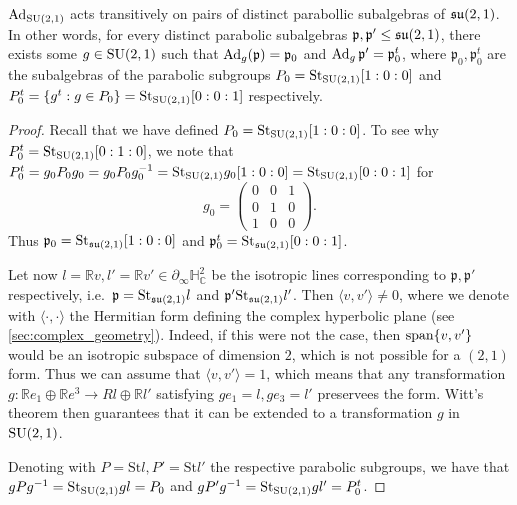 \documentclass{report}
\begin{document}
\begin{lemma}\label{lem:adjoint_parabolic}
    $\operatorname{Ad}_{\operatorname{{\mathrm{SU}}}(2,1)}$ acts transitively on pairs of distinct parabollic subalgebras of $\operatorname{{\mathfrak{su}}}(2,1)$.
    In other words, for every distinct parabolic subalgebras $\mathfrak p, \mathfrak p' \leq \operatorname{{\mathfrak{su}}}(2,1)$, there exists some $g \in \operatorname{{\mathrm{SU}}}(2,1)$ such that $\operatorname{Ad}_g(\mathfrak p) = \mathfrak p_0$ and $\operatorname{Ad}_g \mathfrak p' = \mathfrak p_0^t$, where $\mathfrak p_0,  \mathfrak p_0^t$ are the subalgebras of the parabolic subgroups $P_0 = \mathrm{St}_{\operatorname{{\mathrm{SU}}}(2,1)} [1:0:0]$ and $P_0^t = \left\{ g^t : g \in P_0 \right\} = \mathrm{St}_{\operatorname{{\mathrm{SU}}}(2,1)} [0:0:1]$ respectively.
\end{lemma}
\begin{proof}
    Recall that we have defined $P_0 = \mathrm{St}_{\operatorname{{\mathrm{SU}}}(2,1)}[1:0:0]$.
    To see why $P_0^t = \mathrm{St}_{\operatorname{{\mathrm{SU}}}(2,1)}[0:1:0]$, we note that $P_0^t = g_0 P_0 g_0 = g_0 P_0 g_0^{-1} = \mathrm{St}_{\operatorname{{\mathrm{SU}}}(2,1)} g_0 [1:0:0] = \mathrm{St}_{\operatorname{{\mathrm{SU}}}(2,1)} [0:0:1]$ for
    \[
    g_0 = \begin{pmatrix} 0 & 0 & 1 \\ 0 & 1 & 0 \\ 1 & 0 & 0 \end{pmatrix}.
    \]
    Thus $\mathfrak p_0 = \mathrm{St}_{\operatorname{{\mathfrak{su}}}(2,1)}[1:0:0]$ and $\mathfrak p_0^t = \mathrm{St}_{\operatorname{{\mathfrak{su}}}(2,1)}[0:0:1]$.
    
    Let now $l = \mathbb Rv, l' = \mathbb Rv' \in \partial_\infty \mathbb H^2_\mathbb C$ be the isotropic lines corresponding to $\mathfrak p, \mathfrak p'$ respectively, i.e.\ $\mathfrak p = \mathrm{St}_{\operatorname{{\mathfrak{su}}}(2,1)}l$ and $\mathfrak p' \mathrm{St}_{\operatorname{{\mathfrak{su}}}(2,1)}l'$.
    Then $\langle v, v' \rangle \neq 0$, where we denote with $\langle \cdot, \cdot \rangle$ the Hermitian form defining the complex hyperbolic plane (see \cref{sec:complex_geometry}).
    Indeed, if this were not the case, then $\operatorname{span} \{v, v' \}$ would be an isotropic subspace of dimension $2$, which is not possible for a $(2,1)$ form.
    Thus we can assume that $\langle v, v' \rangle = 1$, which means that any transformation $g: \mathbb R e_1 \oplus \mathbb Re^3 \to R l \oplus \mathbb Rl'$ satisfying $g e_1 = l, ge_3 = l'$ preservees the form.
    Witt's theorem then guarantees that it can be extended to a transformation $g$ in $\operatorname{{\mathrm{SU}}}(2,1)$.

    Denoting with $P = \mathrm{St}l, P' = \mathrm{St}l'$ the respective parabolic subgroups, we have that $g P g^{-1} = \mathrm{St}_{\operatorname{{\mathrm{SU}}}(2,1)}gl = P_0$ and $g P' g^{-1} = \mathrm{St}_{\operatorname{{\mathrm{SU}}}(2,1)}gl' = P_0^t$.
\end{proof}
\end{document}
